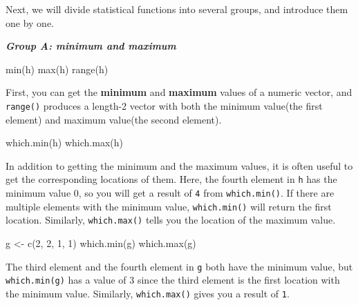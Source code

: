 \documentclass[
]{book}
\newenvironment{Shaded}{\begin{snugshade}}{\end{snugshade}}
\newcommand{\DecValTok}[1]{\textcolor[rgb]{0.00,0.00,0.81}{#1}}
\newcommand{\FunctionTok}[1]{\textcolor[rgb]{0.00,0.00,0.00}{#1}}
\newcommand{\NormalTok}[1]{#1}
\newcommand{\OtherTok}[1]{\textcolor[rgb]{0.56,0.35,0.01}{#1}}
\newenvironment{infobox}[1]
  {
  \begin{itemize}
  \renewcommand{\labelitemi}{
    \raisebox{-.7\height}[0pt][0pt]{
      {\setkeys{Gin}{width=3em,keepaspectratio}
        \texttt{[image: pics/\#1]}}
    }
  }
  \setlength{\fboxsep}{1em}
  \begin{blackbox}
  \item
  }
  {
  \end{blackbox}
  \end{itemize}
  }
\newenvironment{blackbox}{
  \definecolor{shadecolor}{rgb}{0, 0, 0}  %
  \color{white}
  \begin{shaded}}
 {\end{shaded}}
\begin{document}
Next, we will divide statistical functions into several groups, and introduce them one by one.

\textbf{\emph{Group A: minimum and maximum}}

\begin{Shaded}
\begin{Highlighting}[]
\FunctionTok{min}\NormalTok{(h) }
\FunctionTok{max}\NormalTok{(h) }
\FunctionTok{range}\NormalTok{(h)}
\end{Highlighting}
\end{Shaded}

First, you can get the \textbf{minimum} and \textbf{maximum} values of a numeric vector, and \texttt{range()} produces a length-2 vector with both the minimum value(the first element) and maximum value(the second element).

\begin{Shaded}
\begin{Highlighting}[]
\FunctionTok{which.min}\NormalTok{(h) }
\FunctionTok{which.max}\NormalTok{(h) }
\end{Highlighting}
\end{Shaded}

In addition to getting the minimum and the maximum values, it is often useful to get the corresponding locations of them. Here, the fourth element in \texttt{h} has the minimum value 0, so you will get a result of \texttt{4} from \texttt{which.min()}. If there are multiple elements with the minimum value, \texttt{which.min()} will return the first location. Similarly, \texttt{which.max()} tells you the location of the maximum value.

\begin{infobox}{caution}

\begin{Shaded}
\begin{Highlighting}[]
\NormalTok{g }\OtherTok{\textless{}{-}} \FunctionTok{c}\NormalTok{(}\DecValTok{2}\NormalTok{, }\DecValTok{2}\NormalTok{, }\DecValTok{1}\NormalTok{, }\DecValTok{1}\NormalTok{)}
\FunctionTok{which.min}\NormalTok{(g)}
\FunctionTok{which.max}\NormalTok{(g)}
\end{Highlighting}
\end{Shaded}

The third element and the fourth element in \texttt{g} both have the minimum value, but \texttt{which.min(g)} has a value of 3 since the third element is the first location with the minimum value. Similarly, \texttt{which.max()} gives you a result of \texttt{1}.

\end{infobox}
\end{document}
